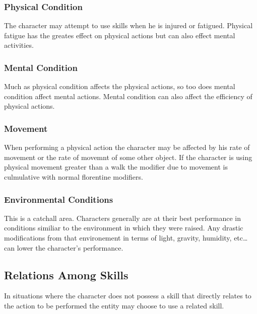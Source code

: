

\subsubsection{Physical Condition}
The character may attempt to use skills when he is injured or 
fatigued. Physical fatigue has the greates effect on physical actions 
but can also effect mental activities.



\subsubsection{Mental Condition}
Much as physical condition affects the physical actions, so too does 
mental condition affect mental actions. Mental condition can also 
affect the efficiency of physical actions.



\subsubsection{Movement} When performing a physical action the
character may be affected by  his rate of movement or the rate of
movemnt of some other object. If the character is using physical
movement greater than a walk the modifier due to movement is 
culmulative with normal florentine modifiers. 

\subsubsection{Environmental Conditions}
This is a catchall area. Characters generally are at their best 
performance in conditions similiar to the environment in which they 
were raised. Any drastic modifications from that environement in 
terms of light, gravity, humidity, etc\dots can lower the character's 
performance.



\subsection{Relations Among Skills}

In situations where the character does not possess a skill that
directly relates to the action to be performed the entity may choose to use
a related skill.

